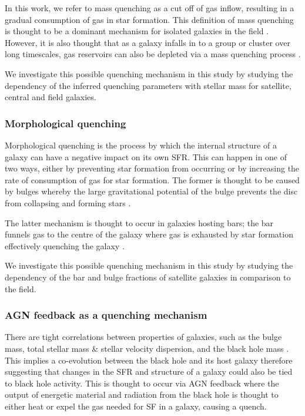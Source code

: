 \documentclass[useAMS,usenatbib]{mn2e}
\begin{document}
In this work, we refer to mass quenching as a cut off of gas inflow, resulting in a gradual consumption of gas in star formation. This definition of mass quenching is thought to be a dominant mechanism for isolated galaxies in the field \citep{kormendy04}. However, it is also thought that as a galaxy infalls in to a group or cluster over long timescales, gas reservoirs can also be depleted via a mass quenching process \citep{peng12}. 

We investigate this possible quenching mechanism in this study by studying the dependency of the inferred quenching parameters with stellar mass for satellite, central and field galaxies. 
 
\subsubsection{Morphological quenching}\label{sec:morphquench}

Morphological quenching is the process by which the internal structure of a galaxy can have a negative impact on its own SFR. This can happen in one of two ways, either by preventing star formation from occurring or by increasing the rate of consumption of gas for star formation. The former is thought to be caused by bulges \citep{bluck14} whereby the large gravitational potential of the bulge prevents the disc from collapsing and forming stars \citep{Fang13}. 

The latter mechanism is thought to occur in galaxies hosting bars; the bar funnels gas to the centre of the galaxy \citep{athanassoula92a} where gas is exhausted by star formation effectively quenching the galaxy \citep{zurita04, sheth05}. 

We investigate this possible quenching mechanism in this study by studying the dependency of the bar and bulge fractions of satellite galaxies in comparison to the field.  

\subsubsection{AGN feedback as a quenching mechanism}\label{sec:agnquench}

There are tight correlations between properties of galaxies, such as the bulge mass, total stellar mass \& stellar velocity dispersion, and the black hole mass \citep{magorrian98, marconi03, haringrix04}. This implies a co-evolution between the black hole and its host galaxy therefore suggesting that changes in the SFR and structure of a galaxy could also be tied to black hole activity. This is thought to occur via AGN feedback where the output of energetic material and radiation from the black hole is thought to either heat or expel the gas needed for SF in a galaxy, causing a quench.
\end{document}
